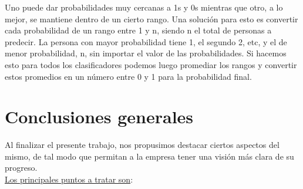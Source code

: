 \documentclass[a4paper ,12pt]{article}
\begin{document}
Uno puede dar probabilidades muy cercanas a 1s y 0s mientras que otro, a lo mejor, se mantiene dentro de un cierto rango.
Una solución para esto es convertir cada probabilidad de un rango entre 1 y n, siendo n el total de personas a predecir. La persona con mayor probabilidad tiene 1,
el segundo 2, etc, y el de menor probabilidad, n, sin importar el valor de las probabilidades. Si hacemos esto para todos los clasificadores podemos luego
promediar los rangos y convertir estos promedios en un número entre 0 y 1 para la probabilidad final.


\newpage
\section{Conclusiones generales}

Al finalizar el presente trabajo, nos propusimos destacar ciertos aspectos del mismo, de tal modo que permitan a la empresa tener una visión más clara de su progreso.\\


\underline{Los principales puntos a tratar son}:
\end{document}
